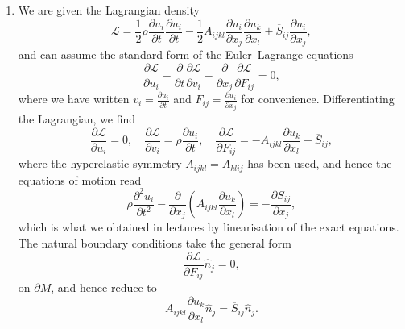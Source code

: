 \documentclass[a4paper,10pt]{paper}
\begin{document}
\begin{enumerate}
\item We are given the Lagrangian density
\begin{equation*}
    \mathcal{L}=\frac{1}{2}\rho\frac{\partial u_{i}}{\partial t}\frac{\partial u_{i}}{\partial t}-\frac{1}{2}A_{ijkl}\frac{\partial u_{i}}{\partial x_{j}}\frac{\partial u_{k}}{\partial x_{l}}+\overline{S}_{ij}\frac{\partial u_{i}}{\partial x_{j}},
\end{equation*}
and can assume the standard form of the Euler--Lagrange equations
\begin{equation*}
    \frac{\partial\mathcal{L}}{\partial u_{i}}-\frac{\partial}{\partial t}\frac{\partial\mathcal{L}}{\partial v_{i}}-\frac{\partial}{\partial x_{j}}\frac{\partial\mathcal{L}}{\partial F_{ij}}=0,
\end{equation*}
where we have written $v_{i}=\frac{\partial u_{i}}{\partial t}$ and $F_{ij}=\frac{\partial u_{i}}{\partial x_{j}}$ for convenience. Differentiating the Lagrangian, we find
\begin{equation*}
    \frac{\partial\mathcal{L}}{\partial u_{i}}=0, \quad \frac{\partial\mathcal{L}}{\partial v_{i}}=\rho\frac{\partial u_{i}}{\partial t}, \quad \frac{\partial\mathcal{L}}{\partial F_{ij}}=-A_{ijkl}\frac{\partial u_{k}}{\partial x_{l}}+\overline{S}_{ij},
\end{equation*}
where the hyperelastic symmetry $A_{ijkl}=A_{klij}$ has been used, and hence the equations of motion read
\begin{equation*}
    \rho\frac{\partial^{2}u_{i}}{\partial t^{2}}-\frac{\partial}{\partial x_{j}}\left(A_{ijkl}\frac{\partial u_{k}}{\partial x_{l}}\right)=-\frac{\partial\overline{S}_{ij}}{\partial x_{j}},
\end{equation*}
which is what we obtained in lectures by linearisation of the exact equations. The natural boundary conditions take the general form
\begin{equation*}
    \frac{\partial\mathcal{L}}{\partial F_{ij}}\hat{n}_{j}=0,
\end{equation*}
on $\partial M$, and hence reduce to
\begin{equation*}
    A_{ijkl}\frac{\partial u_{k}}{\partial x_{l}}\hat{n}_{j}=\overline{S}_{ij}\hat{n}_{j}.
\end{equation*}


\end{enumerate}
\end{document}
